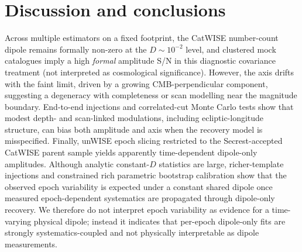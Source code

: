 \documentclass[fleqn,usenatbib]{mnras}
\begin{document}
\section{Discussion and conclusions}
Across multiple estimators on a fixed footprint, the CatWISE number-count dipole remains formally non-zero at the $D\sim10^{-2}$ level, and clustered mock catalogues imply a high \emph{formal} amplitude S/N in this diagnostic covariance treatment (not interpreted as cosmological significance).
However, the axis drifts with the faint limit, driven by a growing CMB-perpendicular component, suggesting a degeneracy with completeness or scan modelling near the magnitude boundary.
End-to-end injections and correlated-cut Monte Carlo tests show that modest depth- and scan-linked modulations, including ecliptic-longitude structure, can bias both amplitude and axis when the recovery model is misspecified.
Finally, unWISE epoch slicing restricted to the Secrest-accepted CatWISE parent sample yields apparently time-dependent dipole-only amplitudes.
Although analytic constant-$D$ statistics are large, richer-template injections and constrained rich parametric bootstrap calibration show that the observed epoch variability is expected under a constant shared dipole once measured epoch-dependent systematics are propagated through dipole-only recovery.
We therefore do not interpret epoch variability as evidence for a time-varying physical dipole; instead it indicates that per-epoch dipole-only fits are strongly systematics-coupled and not physically interpretable as dipole measurements.
\end{document}
